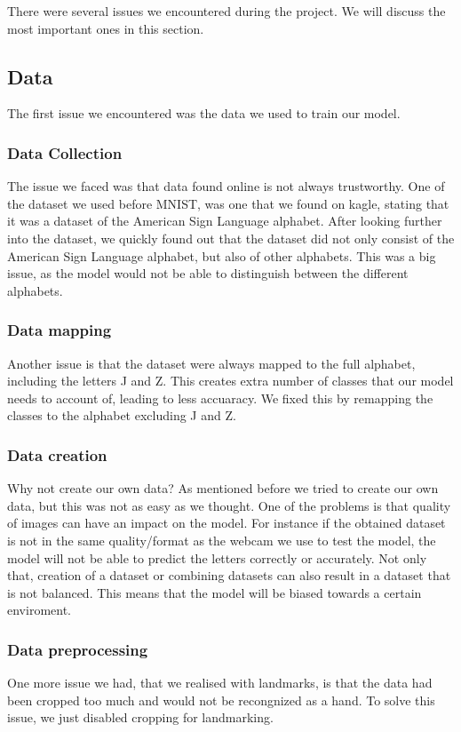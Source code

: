 \documentclass[../paper.tex]{subfiles}
\begin{document}
There were several issues we encountered during the project. 
We will discuss the most important ones in this section.
\subsection{Data}
The first issue we encountered was the data we used to train our model.
\subsubsection{Data Collection}
The issue we faced was that data found online is not always trustworthy.
One of the dataset we used before MNIST, was one that we found on kagle, stating that it was a dataset of the American Sign Language alphabet.
After looking further into the dataset, we quickly found out that the dataset did not only consist of the American Sign Language alphabet, but also of other alphabets.
This was a big issue, as the model would not be able to distinguish between the different alphabets.
\subsubsection{Data mapping}
Another issue is that the dataset were always mapped to the full alphabet, including the letters J and Z.
This creates extra number of classes that our model needs to account of, leading to less accuaracy.
We fixed this by remapping the classes to the alphabet excluding J and Z.
\subsubsection{Data creation}
Why not create our own data? As mentioned before we tried to create our own data, but this was not as easy as we thought.
One of the problems is that quality of images can have an impact on the model. 
For instance if the obtained dataset is not in the same quality/format as the webcam we use to test the model, the model will not be able to predict the letters correctly or accurately.
Not only that, creation of a dataset or combining datasets can also result in a dataset that is not balanced.
This means that the model will be biased towards a certain enviroment.
\subsubsection{Data preprocessing}
One more issue we had, that we realised with landmarks, 
is that the data had been cropped too much and would not be recongnized as a hand.
To solve this issue, we just disabled cropping for landmarking.
\end{document}

